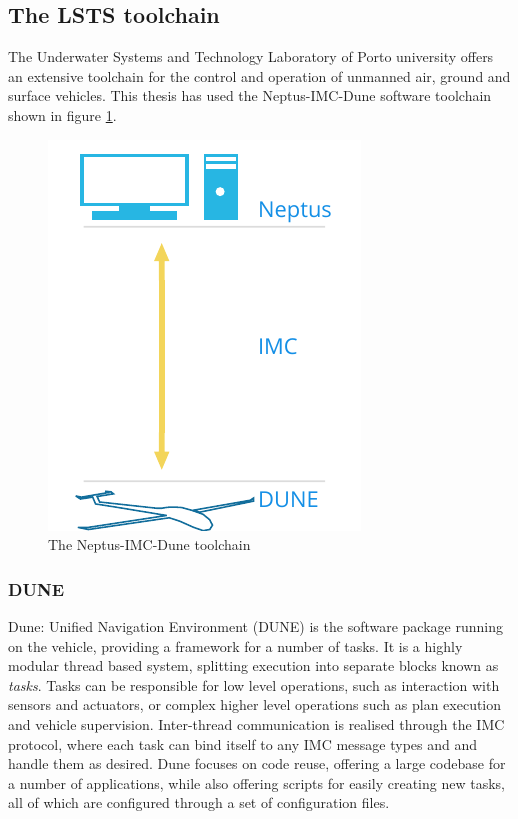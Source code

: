 \subsection{The LSTS toolchain}
    The Underwater Systems and Technology Laboratory of Porto university offers an extensive toolchain for the control and operation of unmanned air, ground and surface vehicles. This thesis has used the Neptus-IMC-Dune software toolchain shown in figure \ref{fig:lsts-toolchain}.
    
    \begin{figure}[!htbp]
        \centering
        \includegraphics{bilder/lsts-toolchain.pdf}
        \caption{The Neptus-IMC-Dune toolchain}
        \label{fig:lsts-toolchain}
    \end{figure}
    \subsubsection{DUNE}
    Dune: Unified Navigation Environment (DUNE) is the software package running on the vehicle, providing a framework for a number of tasks. It is a highly modular thread based system, splitting execution into separate blocks known as \textit{tasks}. Tasks can be responsible for low level operations, such as interaction with sensors and actuators, or complex higher level operations such as plan execution and vehicle supervision. Inter-thread communication is realised through the IMC protocol, where each task can bind itself to any IMC message types and and handle them as desired. Dune focuses on code reuse, offering a large codebase for a number of applications, while also offering scripts for easily creating new tasks, all of which are configured through a set of configuration files. 
    
